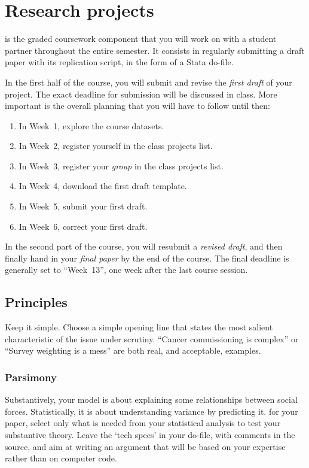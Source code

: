 \chapter{Research projects}%
	\label{ch:paper}

 is the graded coursework component that you will work on with a student partner throughout the entire semester. It consists in regularly submitting a draft paper with its replication script, in the form of a Stata do-file.

In the first half of the course, you will submit and revise the \emph{first draft} of your project. The exact deadline for submission will be discussed in class. More important is the overall planning that you will have to follow until then:

\begin{enumerate}
  \item In Week~1, explore the course datasets.
  \item In Week~2, register yourself in the class projects list.
  \item In Week~3, register your \emph{group} in the class projects list.
  \item In Week~4, download the first draft template.
  \item In Week~5, submit your first draft.
  \item In Week~6, correct your first draft.
\end{enumerate}

In the second part of the course, you will resubmit a \emph{revised draft}, and then finally hand in your \emph{final paper} by the end of the course. The final deadline is generally set to ``Week~13'', one week after the last course session.

\section{Principles}

Keep it simple. Choose a simple opening line that states the most salient characteristic of the issue under scrutiny. ``Cancer commissioning is complex'' or ``Survey weighting is a mess'' are both real, and acceptable, examples.

\subsection{Parsimony}

Substantively, your model is about explaining some relationships between social forces. Statistically, it is about understanding variance by predicting it. for your paper, select only what is needed from your statistical analysis to test your substantive theory. Leave the `tech specs' in your do-file, with comments in the source, and aim at writing an argument that will be based on your expertise rather than on computer code.

